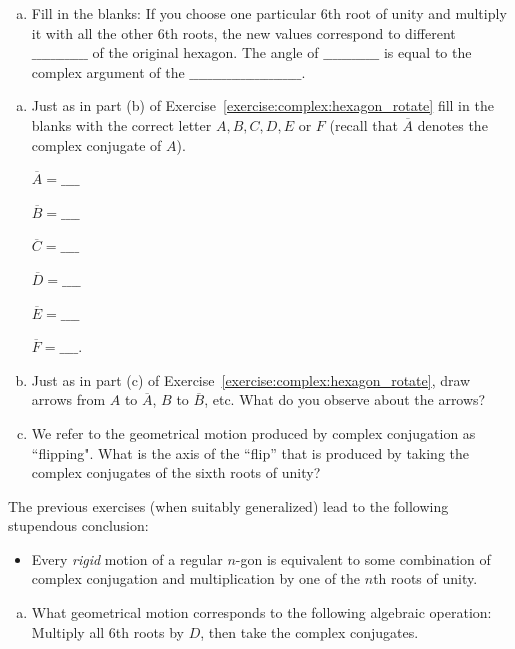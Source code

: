 {\begin{exercise}
\begin{enumerate}[(a)]
\item
Fill in the blanks:  If you choose one particular 6th root of unity and multiply it with all the other 6th roots, the new values correspond to different $\_\_\_\_\_\_\_\_\_\_\_\_$ of the original hexagon. The angle of $\_\_\_\_\_\_\_\_\_\_\_\_$ is equal to the complex argument of the $\_\_\_\_\_\_\_\_\_\_\_\_\_\_\_\_\_\_\_\_\_\_\_\_$.
\end{enumerate}
\end{exercise}

\begin{exercise}\label{exercise:complex:55}
\begin{enumerate}[(a)]
\item
Just as in part (b) of Exercise~\ref{exercise:complex:hexagon_rotate} fill in the blanks with the correct letter $A,B,C,D,E$ or $F$ (recall that $\overline{A}$ denotes the complex conjugate of $A$).
\begin{multicols}{3}
$ \overline{A} = \_\_\_\_ $

$  \overline{B} = \_\_\_\_ $

$  \overline{C} = \_\_\_\_ $

 $ \overline{D} = \_\_\_\_ $

$ \overline{E} = \_\_\_\_ $

 $ \overline{F} = \_\_\_\_.  $
\end{multicols}
\item 
Just as in part (c) of Exercise~\ref{exercise:complex:hexagon_rotate}, draw arrows from $A$ to $\overline{A}$, $B$ to $\overline{B}$, etc. What do you observe about the arrows?

\item We refer to the geometrical motion produced by complex conjugation as ``flipping". What is the axis of the ``flip'' that is produced by taking the complex conjugates of the sixth roots of unity?
\end{enumerate}
\end{exercise}

The previous exercises (when suitably generalized) lead to the following stupendous conclusion:

\begin{itemize}
\item
Every \emph{rigid} motion of a regular $n$-gon is equivalent to some combination of complex conjugation and multiplication by one of the $n$th roots of unity.
\end{itemize}

\begin{exercise}\label{exercise:complex:non_comm}
\begin{enumerate}[(a)]
\item 
What geometrical motion corresponds to the following algebraic operation:
Multiply all 6th roots by $D$, then take the complex conjugates.


\end{enumerate}
\end{exercise}}
